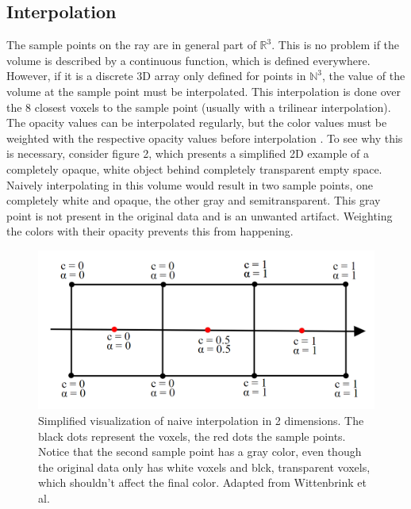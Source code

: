 \subsection{Interpolation}
The sample points on the ray are in general part of $\mathbb{R}^3$. This is no problem if the volume is described by a continuous function, which is defined everywhere. However, if it is a discrete 3D array only defined for points in $\mathbb{N}^3$, the value of the volume at the sample point must be interpolated.
 This interpolation is done over the 8 closest voxels to the sample point (usually with a trilinear interpolation). The opacity values can be interpolated regularly, but the color values must be weighted with the respective opacity values before interpolation \cite{729595}. To see why this is necessary, consider figure 2, which presents a simplified 2D example of a completely  opaque, white object behind completely transparent empty space. Naively interpolating in this volume would result in two sample points, one completely white and opaque, the other gray and semitransparent. This gray point is not present in the original data and is an unwanted artifact. Weighting the colors with their opacity prevents this from happening.
 \begin{figure}[htb]
  \centering
  \includegraphics[width=.8\linewidth]{weighted_interpolation.png}
  \parbox[t]{.9\columnwidth}{\relax}
  \caption{\label{fig:img5}
          Simplified visualization of naive interpolation in 2 dimensions. The black dots represent the voxels, the red dots the sample points. Notice that the second sample point has a gray color, even though the original data only has white voxels and blck, transparent voxels, which shouldn't affect the final color. Adapted from Wittenbrink et al.\cite{729595}}
\end{figure}
